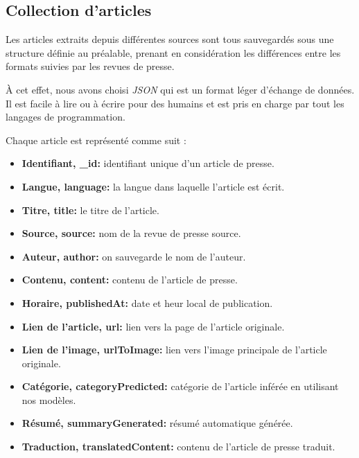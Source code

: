 \subsection{Collection d'articles}
Les articles extraits depuis différentes sources sont tous sauvegardés sous une structure définie au préalable, prenant en considération les différences entre les formats suivies par les revues de presse. 

À cet effet, nous avons choisi \emph{JSON} qui est un format léger d'échange de données. Il est facile à lire ou à écrire pour des humains \cite{json} et est pris en charge par tout les langages de programmation.

Chaque article est représenté comme suit :
\begin{itemize}
    \item \textbf{Identifiant, \textquotedbl \_id\textquotedbl: } identifiant unique d'un article de presse.
    \item \textbf{Langue, \textquotedbl language\textquotedbl:} la langue dans laquelle l'article est écrit.
    \item \textbf{Titre, \textquotedbl title\textquotedbl:} le titre de l'article.
    \item \textbf{Source, \textquotedbl source\textquotedbl:} nom de la revue de presse source.
    \item \textbf{Auteur, \textquotedbl author\textquotedbl:} on sauvegarde le nom de l'auteur.
    \item \textbf{Contenu, \textquotedbl content\textquotedbl:} contenu de l'article de presse.
    \item \textbf{Horaire, \textquotedbl publishedAt\textquotedbl:} date et heur local de publication.
    \item \textbf{Lien de l'article, \textquotedbl url\textquotedbl:} lien vers la page de l'article originale.
    \item \textbf{Lien de l'image, \textquotedbl urlToImage\textquotedbl:} lien vers l'image principale de l'article originale.
    \item \textbf{Catégorie, \textquotedbl categoryPredicted\textquotedbl:} catégorie de l'article inférée en utilisant nos modèles.
    \item \textbf{Résumé, \textquotedbl summaryGenerated\textquotedbl:} résumé automatique générée.
    \item \textbf{Traduction, \textquotedbl translatedContent\textquotedbl:} contenu de l'article de presse traduit.\\
\end{itemize}

